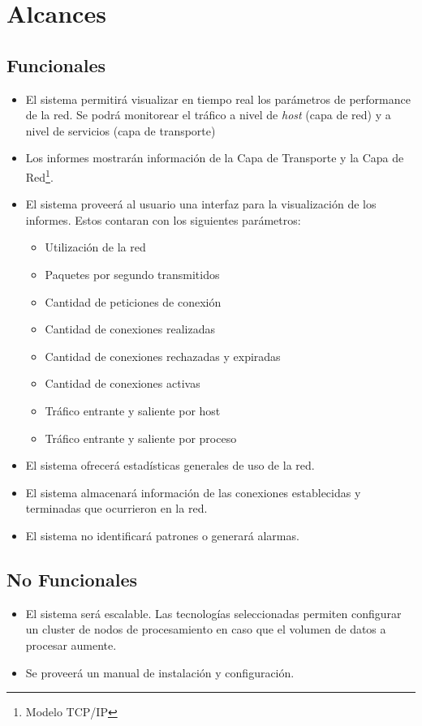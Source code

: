 \section*{Alcances}

\subsection*{Funcionales}
\begin{itemize}
	\item El sistema permitirá visualizar en tiempo real los parámetros de performance de la red. Se podrá monitorear el tráfico a nivel de \textit{host} (capa de red) y a nivel de servicios (capa de transporte)
	\item Los informes mostrarán información de la Capa de Transporte y la Capa de Red\footnote{Modelo TCP/IP}. \cite{rfc791}\cite{rfc793}\cite{rfc1180}
	\item El sistema proveerá al usuario una interfaz para la visualización de los informes. Estos contaran con los siguientes parámetros:
	\begin{itemize}
		\item Utilización de la red
		\item Paquetes por segundo transmitidos
		\item Cantidad de peticiones de conexión
		\item Cantidad de conexiones realizadas
		\item Cantidad de conexiones rechazadas y expiradas
		\item Cantidad de conexiones activas
		\item Tráfico entrante y saliente por host
		\item Tráfico entrante y saliente por proceso
	\end{itemize}
	\item El sistema ofrecerá estadísticas generales de uso de la red.
	\item El sistema almacenará información de las conexiones establecidas y terminadas que ocurrieron en la red.
	\item El sistema no identificará patrones o generará alarmas.
\end{itemize}

\subsection*{No Funcionales}
\begin{itemize}
	\item El sistema será escalable. Las tecnologías seleccionadas permiten configurar un cluster de nodos de procesamiento en caso que el volumen de datos a procesar aumente.
	\item Se proveerá un manual de instalación y configuración.
\end{itemize}
 
